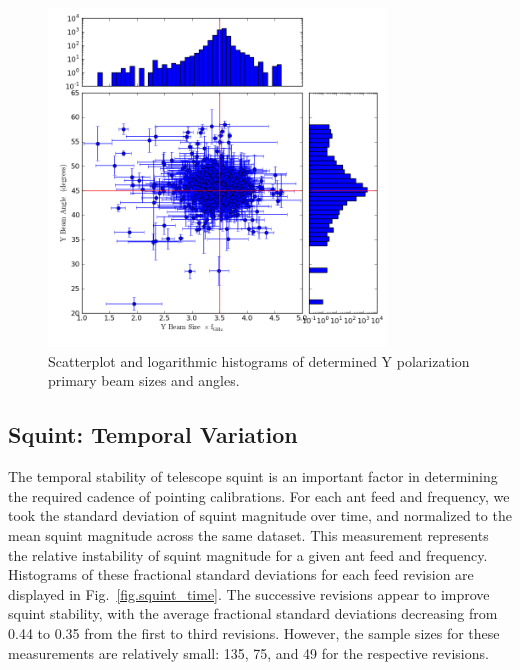 \documentclass[preprint]{aastex}
\begin{document}
\begin{figure}[htb]
\begin{center}
\includegraphics[width=0.8\textwidth]{images/y_magangle}
\caption{Scatterplot and logarithmic histograms of determined Y polarization primary beam sizes and angles. \label{fig.y_shape}}
\end{center}
\end{figure}

\subsection{Squint: Temporal Variation}\label{ss.temporal}
The temporal stability of telescope squint is an important factor in determining the required cadence of pointing calibrations.  For each ant feed and frequency, we took the standard deviation of squint magnitude over time, and normalized to the mean squint magnitude across the same dataset.  This measurement represents the relative instability of squint magnitude for a given ant feed and frequency.  Histograms of these fractional standard deviations for each feed revision are displayed in Fig.~\ref{fig.squint_time}.  The successive revisions appear to improve squint stability, with the average fractional standard deviations decreasing from 0.44 to 0.35 from the first to third revisions.  However, the sample sizes for these measurements are relatively small: 135, 75, and 49 for the respective revisions.  
\end{document}
